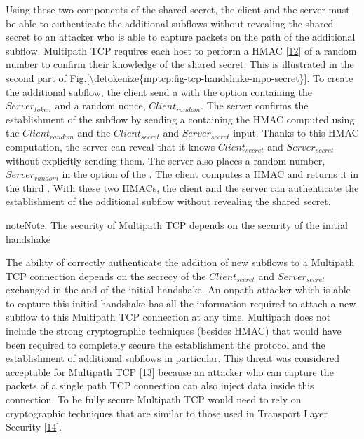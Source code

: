 \documentclass[letterpaper,10pt,english]{sphinxmanual}
\begin{document}
Using these two components of the shared secret, the client and the server must be able to authenticate the additional subflows without revealing the shared secret to an attacker who is able to capture packets on the path of the additional subflow. Multipath TCP requires each host to perform a HMAC {[}\hyperlink{cite.biblio:id2034}{12}{]} of a random number to confirm their knowledge of the shared secret. This is illustrated in the second part of \hyperref[\detokenize{mptcp:fig-tcp-handshake-mpo-secret}]{Fig.\@ \ref{\detokenize{mptcp:fig-tcp-handshake-mpo-secret}}}. To create the additional subflow, the client send a  with the  option containing the \(Server_{token}\) and a random nonce, \(Client_{random}\). The server confirms the establishment of the subflow by sending a  containing the HMAC computed using the \(Client_{random}\) and the \(Client_{secret}\) and \(Server_{secret}\) input. Thanks to this HMAC computation, the server can reveal that it knows \(Client_{secret}\) and \(Server_{secret}\) without explicitly sending them. The server also places a random number, \(Server_{random}\) in the  option of the . The client computes a HMAC and returns it in the third . With these two HMACs, the client and the server can authenticate the establishment of the additional subflow without revealing the shared secret.

\begin{sphinxadmonition}{note}{Note:}
\sphinxAtStartPar
The security of Multipath TCP depends on the security of the initial handshake

\sphinxAtStartPar
The ability of correctly authenticate the addition of new subflows to a Multipath TCP connection depends on the secrecy of the \(Client_{secret}\) and \(Server_{secret}\) exchanged in the  and  of the initial handshake. An on\sphinxhyphen{}path attacker which is able to capture this initial handshake has all the information required to attach a new subflow to this Multipath TCP connection at any time. Multipath does not include the strong cryptographic techniques (besides HMAC) that would have been required to completely secure the establishment the protocol and the establishment of additional subflows in particular. This threat was considered acceptable for Multipath TCP {[}\hyperlink{cite.biblio:id6032}{13}{]} because an attacker who can capture the packets of a single path TCP connection can also inject data inside this connection. To be fully secure Multipath TCP would need to rely on cryptographic techniques that are similar to those used in Transport Layer Security {[}\hyperlink{cite.biblio:id8271}{14}{]}.
\end{sphinxadmonition}
\end{document}
